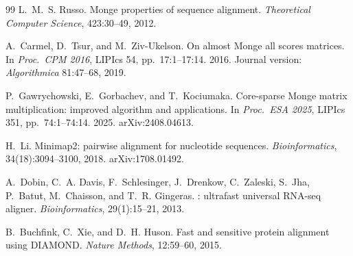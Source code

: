 \documentclass[11pt, a4paper]{article}
\theoremstyle{definition}
\theoremstyle{remark}
\begin{document}
\begin{thebibliography}{99}
L.~M.~S. Russo.
\newblock Monge properties of sequence alignment.
\newblock \emph{Theoretical Computer Science}, 423:30--49, 2012.

A.~Carmel, D.~Tsur, and M.~Ziv-Ukelson.
\newblock On almost {M}onge all scores matrices.
\newblock In \emph{Proc.\ CPM 2016}, LIPIcs 54, pp.~17:1--17:14. 2016.
  Journal version: \emph{Algorithmica} 81:47--68, 2019.

P.~Gawrychowski, E.~Gorbachev, and T.~Kociumaka.
\newblock Core-sparse {M}onge matrix multiplication: improved algorithm
  and applications.
\newblock In \emph{Proc.\ ESA 2025}, LIPIcs 351, pp.~74:1--74:14. 2025.
  arXiv:2408.04613.

H.~Li.
\newblock Minimap2: pairwise alignment for nucleotide sequences.
\newblock \emph{Bioinformatics}, 34(18):3094--3100, 2018.
  arXiv:1708.01492.

A.~Dobin, C.~A. Davis, F.~Schlesinger, J.~Drenkow, C.~Zaleski,
  S.~Jha, P.~Batut, M.~Chaisson, and T.~R. Gingeras.
: ultrafast universal {RNA}-seq aligner.
\newblock \emph{Bioinformatics}, 29(1):15--21, 2013.

B.~Buchfink, C.~Xie, and D.~H. Huson.
\newblock Fast and sensitive protein alignment using {DIAMOND}.
\newblock \emph{Nature Methods}, 12:59--60, 2015.

\end{thebibliography}
\end{document}
